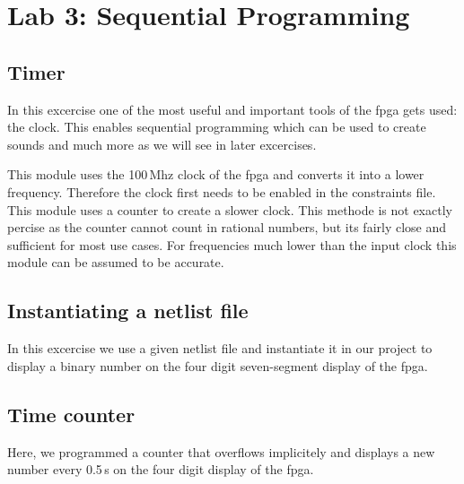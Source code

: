 \chapter{Lab 3: Sequential Programming} \label{day3}



\section{Timer}

In this excercise one of the most useful and important tools of the \gls{fpga} gets used: the clock. This enables sequential programming which can be used to create sounds and much more as we will see in later excercises.

This module uses the 100\,Mhz clock of the \gls{fpga} and converts it into a lower frequency. Therefore the clock first needs to be enabled in the constraints file. This module uses a counter to create a slower clock. This methode is not exactly percise as the counter cannot count in rational numbers, but its fairly close and sufficient for most use cases. For frequencies much lower than the input clock this module can be assumed to be accurate.







\section{Instantiating a netlist file}

In this excercise we use a given netlist file and instantiate it in our project to display a binary number on the four digit seven-segment display of the \gls{fpga}. 



\section{Time counter}

Here, we programmed a counter that overflows implicitely and displays a new number every 0.5\,s on the four digit display of the \gls{fpga}. 

